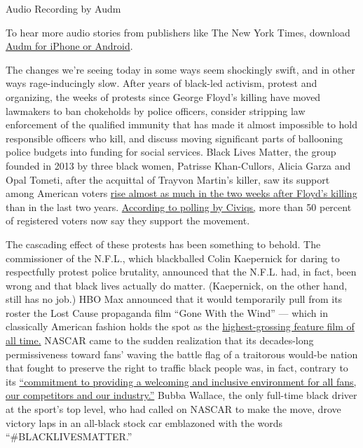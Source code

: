 Audio Recording by Audm

To hear more audio stories from publishers like The New York Times,
download
\href{https://www.audm.com/?utm_source=nytmag\&utm_medium=embed\&utm_campaign=owed_black_americans}{Audm
for iPhone or Android}.

The changes we're seeing today in some ways seem shockingly swift, and
in other ways rage-inducingly slow. After years of black-led activism,
protest and organizing, the weeks of protests since George Floyd's
killing have moved lawmakers to ban chokeholds by police officers,
consider stripping law enforcement of the qualified immunity that has
made it almost impossible to hold responsible officers who kill, and
discuss moving significant parts of ballooning police budgets into
funding for social services. Black Lives Matter, the group founded in
2013 by three black women, Patrisse Khan-Cullors, Alicia Garza and Opal
Tometi, after the acquittal of Trayvon Martin's killer, saw its support
among American voters
\href{https://www.nytimes3xbfgragh.onion/interactive/2020/06/10/upshot/black-lives-matter-attitudes.html}{rise
almost as much in the two weeks after Floyd's killing} than in the last
two years.
\href{https://civiqs.com/results/black_lives_matter?uncertainty=true\&annotations=true\&zoomIn=true}{According
to polling by Civiqs,} more than 50 percent of registered voters now say
they support the movement.

The cascading effect of these protests has been something to behold. The
commissioner of the N.F.L., which blackballed Colin Kaepernick for
daring to respectfully protest police brutality, announced that the
N.F.L. had, in fact, been wrong and that black lives actually do matter.
(Kaepernick, on the other hand, still has no job.) HBO Max announced
that it would temporarily pull from its roster the Lost Cause propaganda
film ``Gone With the Wind'' --- which in classically American fashion
holds the spot as the
\href{https://www.nytimes3xbfgragh.onion/2020/06/14/movies/gone-with-the-wind-battle.html}{highest-grossing
feature film of all time.} NASCAR came to the sudden realization that
its decades-long permissiveness toward fans' waving the battle flag of a
traitorous would-be nation that fought to preserve the right to traffic
black people was, in fact, contrary to its
\href{https://www.nascar.com/news-media/2020/06/10/nascar-statement-on-confederate-flag/}{``commitment
to providing a welcoming and inclusive environment for all fans, our
competitors and our industry.''} Bubba Wallace, the only full-time black
driver at the sport's top level, who had called on NASCAR to make the
move, drove victory laps in an all-black stock car emblazoned with the
words ``\#BLACKLIVESMATTER.''

